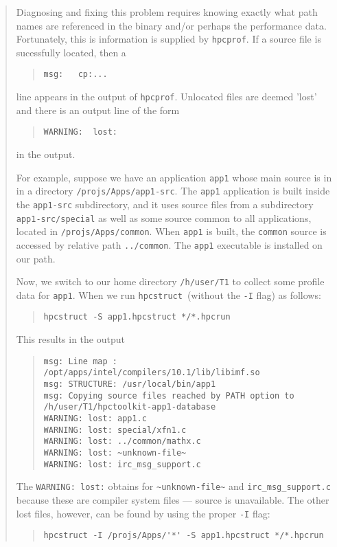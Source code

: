 \documentclass{article}
\newcommand{\hpcstruct}{\texttt{hpcstruct}}
\newcommand{\hpcprof}{\texttt{hpcprof}}
\begin{document}
\begin{quote}
Diagnosing and fixing this problem requires knowing exactly what path
names are referenced in the binary and/or perhaps the performance
data. Fortunately, this is information is supplied by \hpcprof .
If a source file is sucessfully located, then a 
\begin{quote}
\verb|msg:   cp:...|
\end{quote}
line appears in the output of \hpcprof . Unlocated files are deemed 'lost'
and there is an output line of the form 
\begin{quote}
\verb|WARNING:  lost:|
\end{quote}
in the output.

For example, suppose we have an application \verb|app1| whose main source 
is in in a directory \verb|/projs/Apps/app1-src|. The \verb|app1|
application is built inside the \verb|app1-src| subdirectory, and it uses
source files from a subdirectory \verb|app1-src/special| as well as some
source common to all applications, located in
\verb|/projs/Apps/common|. When \verb|app1| is built, the
\verb|common| source is accessed by relative path \verb|../common|.
The \verb|app1| executable is installed on our path.

Now, we switch to our home directory \verb|/h/user/T1| to collect
some profile data for \verb|app1|.
When we run \hpcstruct\ (without the \verb|-I| flag) as follows:
\begin{quote}
  \verb|hpcstruct -S app1.hpcstruct */*.hpcrun|
\end{quote}
This results in the output
\begin{quote}
\begin{Verbatim}[fontsize=\small]
msg: Line map : /opt/apps/intel/compilers/10.1/lib/libimf.so
msg: STRUCTURE: /usr/local/bin/app1
msg: Copying source files reached by PATH option to /h/user/T1/hpctoolkit-app1-database
WARNING: lost: app1.c
WARNING: lost: special/xfn1.c
WARNING: lost: ../common/mathx.c
WARNING: lost: ~unknown-file~
WARNING: lost: irc_msg_support.c
\end{Verbatim}
\end{quote}
The \verb|WARNING: lost:| obtains for \verb|~unknown-file~| and
\verb|irc_msg_support.c| because these are compiler system files --- source
is unavailable. The other lost files, however, can be found by using
the proper \verb|-I| flag:
\begin{quote}
\begin{verbatim}
hpcstruct -I /projs/Apps/'*' -S app1.hpcstruct */*.hpcrun
\end{verbatim}
\end{quote}


\end{quote}
\end{document}
